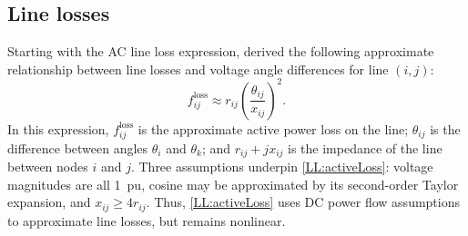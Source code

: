 \documentclass[conference]{IEEEtran}
\begin{document}

\subsection{Line losses}\label{sec:line-losses}

Starting with the AC line loss expression, \cite{almassalkhi2014}
derived the following approximate relationship between line losses and
voltage angle differences for line $(i,j)$:
\begin{equation}
\label{LL:activeLoss}
f_{ij}^{\text{loss}} \approx r_{ij}\left(\frac{\theta_{ij}}{x_{ij}}\right)^2.
\end{equation}
In this expression, $f_{ij}^{\text{loss}}$ is the approximate active
power loss on the line; $\theta_{ij}$ is the difference between angles
$\theta_i$ and $\theta_k$; and $r_{ij} +j x_{ij}$ is the impedance of
the line between nodes $i$ and $j$. Three assumptions underpin
\eqref{LL:activeLoss}: voltage magnitudes are all 1~pu, cosine may be
approximated by its second-order Taylor expansion, and $x_{ij} \geq
4r_{ij}$. Thus, \eqref{LL:activeLoss} uses DC power flow assumptions
to approximate line losses, but remains nonlinear.
\end{document}
